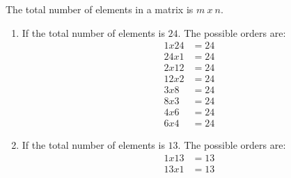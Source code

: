 The total number of elements in a matrix is $m\ x\ n$. \\
\begin{enumerate}
\item If the total number of elements is $24$. The possible orders are:
\begin{align}
1 x 24 &= 24\\
24 x 1 &= 24\\
2 x 12 &= 24\\
12 x 2 &= 24\\
3 x 8 &= 24\\
8 x 3 &= 24\\
4 x 6 &= 24\\
6 x 4 &= 24
\end{align}

\item If the total number of elements is $13$. The possible orders are:
\begin{align}
1 x 13 &= 13\\
13 x 1 &= 13
\end{align}
\end{enumerate}
\newpage


